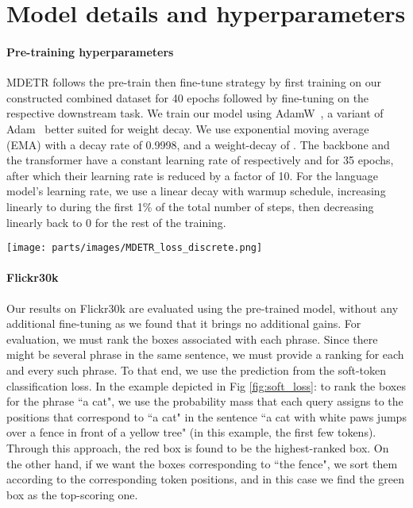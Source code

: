 \appendix\newpage
\onecolumn

\section{Model details and hyperparameters}
\label{sec:appendix_hyperparameters}

\paragraph{Pre-training hyperparameters}
MDETR follows the pre-train then fine-tune strategy by first training on our constructed combined dataset for 40 epochs followed by fine-tuning on the respective downstream task. We train our model using AdamW~\cite{loshchilovDecoupledWeightDecay2019}, a variant of Adam~\cite{kingmaAdamMethodStochastic2017} better suited for weight decay. We use exponential moving average (EMA) with a decay rate of 0.9998, and a weight-decay of . The backbone and the transformer have a constant learning rate of respectively  and  for 35 epochs, after which their learning rate is reduced by a factor of 10. For the language model's learning rate, we use a linear decay with warmup schedule, increasing linearly to  during the first 1\% of the total number of steps, then decreasing linearly back to 0 for the rest of the training.
\begin{figure*}[h]
 \centering
 \texttt{[image: parts/images/MDETR\_loss\_discrete.png]}
 \caption{Illustration of the soft-token classification loss. For each object, the model predicts a distribution over the token positions in the input sequence. The weight of the distribution should be equally spread over all the tokens that refer to the predicted box.}
 \label{fig:soft_loss}
\end{figure*}

\paragraph{Flickr30k} Our results on Flickr30k are evaluated using the pre-trained model, without any additional fine-tuning as we found that it brings no additional gains.
For evaluation, we must rank the boxes associated with each phrase. Since there might be several phrase in the same sentence, we must provide a ranking for each and every such phrase. To that end, we use the prediction from the soft-token classification loss. In the example depicted in Fig \ref{fig:soft_loss}: to rank the boxes for the phrase ``a cat", we use the probability mass that each query assigns to the positions that correspond to ``a cat" in the sentence ``a cat with white paws jumps over a fence in front of a yellow tree" (in this example, the first few tokens). Through this approach,  the red box is found to be the highest-ranked box. On the other hand, if we want the boxes corresponding to ``the fence", we sort them according to the corresponding token positions, and in this case we find the green box as the top-scoring one.

